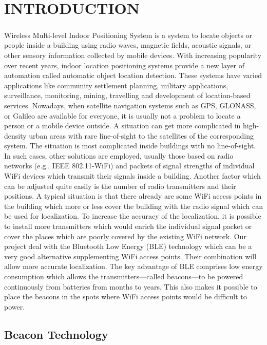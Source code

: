 \documentclass[a4paper,12pt]{report}
\begin{document}
\chapter{INTRODUCTION}
\paragraph{}Wireless Multi-level Indoor Positioning System is a system to locate objects or people inside a building using radio waves, magnetic fields, acoustic signals, or other sensory information collected by mobile devices. With increasing popularity over recent years, indoor location positioning systems provide a new layer of automation called automatic object location detection. These systems have varied applications like community settlement planning, military applications, surveillance, monitoring, mining, travelling and development of location-based services. Nowadays, when satellite navigation systems such as GPS, GLONASS, or Galileo are available for everyone, it is usually not a problem to locate a person or a mobile device outside. A situation can get more complicated in high-density urban areas with rare line-of-sight to the satellites of the corresponding system. The situation is most complicated inside buildings with no line-of-sight. In such cases, other solutions are employed, usually those based on radio networks (e.g., IEEE 802.11-WiFi) and packets of signal strengths of individual WiFi devices which transmit their signals inside a building. Another factor which can be adjusted quite easily is the number of radio transmitters and their positions. A typical situation is that there already are some WiFi access points in the building which more or less cover the building with the radio signal which can be used for localization. To increase the accuracy of the localization, it is possible to install more transmitters which would enrich the individual signal packet or cover the places which are poorly covered by the existing WiFi network. Our project deal with the Bluetooth Low Energy (BLE) technology which can be a very good alternative supplementing WiFi access points. Their combination will allow more accurate localization. The key advantage of BLE comprises low energy consumption which allows the transmitters—called beacons—to be powered continuously from batteries from months to years. This also makes it possible to place the beacons in the spots where WiFi access points would be difficult to power.
\section{Beacon Technology}
\end{document}
